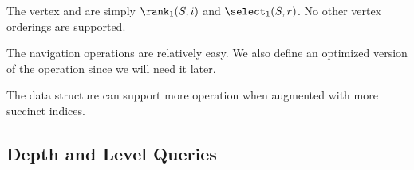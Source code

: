 The vertex \inRank{} and \inSelect{} are simply $\rank_1(S, i)$ and $\select_1(S, r)$.
No other vertex orderings are supported.

The navigation operations are relatively easy.
We also define an optimized version of the operation \childLast since we will need it later.

\begin{algorithmic}
	\State {}
\EndFunction
\end{algorithmic}

\begin{algorithmic}
	\State {} 
\EndFunction
\end{algorithmic}

\begin{algorithmic}
	\State {} 
\EndFunction
\end{algorithmic}

\begin{algorithmic}
	\State {} 
\EndFunction
\end{algorithmic}

\begin{algorithmic}
	\State {} 
\EndFunction
\end{algorithmic}

\begin{algorithmic}
	\State {}
\EndFunction
\end{algorithmic}

\begin{algorithmic}
 
	\State {}
\EndFunction
\end{algorithmic}

\bigbreak

The data structure can support more operation when augmented with more succinct indices.

\subsection{Depth and Level Queries}

